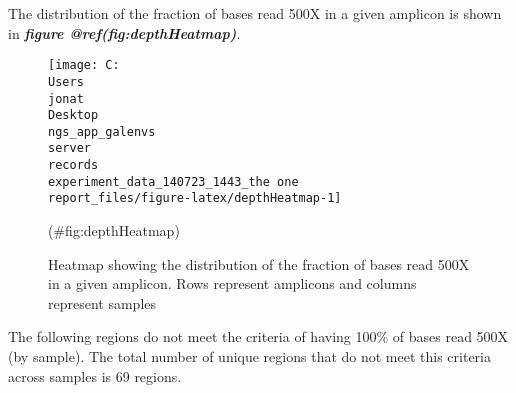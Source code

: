 \documentclass[
]{article}
\begin{document}
The distribution of the fraction of bases read 500X in a given amplicon is shown in \textbf{\emph{figure @ref(fig:depthHeatmap)}}.

\begin{figure}
\texttt{[image: C:\\Users\\jonat\\Desktop\\ngs\_app\_galenvs\\server\\records\\experiment\_data\_140723\_1443\_the one\\report\_files/figure-latex/depthHeatmap-1]} \caption[Depth 500X Heatmap]{Heatmap showing the distribution of the fraction of bases read 500X in a given amplicon. Rows represent amplicons and columns represent samples}(\#fig:depthHeatmap)
\end{figure}

The following regions do not meet the criteria of having 100\% of bases read 500X (by sample). The total number of unique regions that do not meet this criteria across samples is 69 regions.
\end{document}
